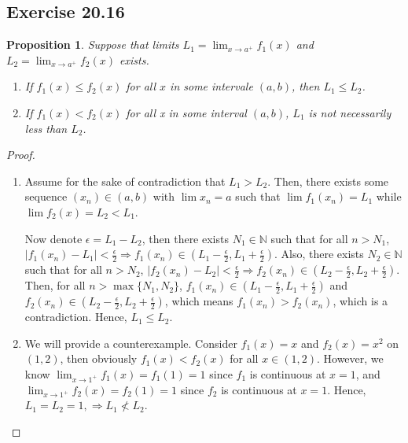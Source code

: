 \documentclass{article}
\newtheorem{proposition}[thm]{Proposition}
\renewcommand*{\implies}{\ensuremath{\Longrightarrow}}
\newcommand*{\N}{\ensuremath{\mathbb{N}}}
\begin{document}
\subsection*{Exercise 20.16}
\begin{proposition}
    Suppose that limits $L_1=\lim_{x\to a^+}f_1(x)$ and $L_2=\lim_{x\to a^+}f_2(x)$ 
    exists. 
    \begin{enumerate}
        \item [\textbf{(a)}] If $f_1(x)\le f_2(x)$ for all $x$ in some intervale $(a,b)$, 
        then $L_1\le L_2$.

        \item [\textbf{(b)}] If $f_1(x)<f_2(x)$ for all x in some interval $(a,b)$, 
        $L_1$ is not necessarily less than $L_2$.
    \end{enumerate}
\end{proposition}
\begin{proof}
    \begin{enumerate}
        \item [\textbf{(a)}] Assume for the sake of contradiction that $L_1 > L_2$. Then, 
        there exists some sequence $(x_n)\in(a,b)$ with $\lim x_n=a$ such that $\lim f_1(x_n)=L_1$ 
        while $\lim f_2(x)=L_2<L_1$.

        Now denote $\epsilon = L_1-L_2$, then there exists $N_1\in\N$ such that for all $n>N_1$, 
        $|f_1(x_n)-L_1|<\frac{\epsilon}{2}\implies f_1(x_n)\in(L_1-\frac{\epsilon}{2},L_1+\frac{\epsilon}{2})$. Also, 
        there exists $N_2\in\N$ such that for all $n>N_2$,
        $|f_2(x_n)-L_2|<\frac{\epsilon}{2}\implies f_2(x_n)\in(L_2-\frac{\epsilon}{2},L_2+\frac{\epsilon}{2})$. 
        Then, for all $n>\max\{N_1,N_2\}$, $f_1(x_n)\in(L_1-\frac{\epsilon}{2},L_1+\frac{\epsilon}{2})$ and
        $f_2(x_n)\in(L_2-\frac{\epsilon}{2},L_2+\frac{\epsilon}{2})$, which means $f_1(x_n)>f_2(x_n)$, which is a
        contradiction. Hence, $L_1\le L_2$.

        \item [\textbf{(b)}] We will provide a counterexample. Consider $f_1(x)=x$ and $f_2(x)=x^2$ on
        $(1,2)$, then obviously $f_1(x)<f_2(x)$ for all $x\in(1,2)$. However, we know 
        $\lim_{x\to 1^+}f_1(x)=f_1(1)=1$ since $f_1$ is continuous at $x=1$, and 
        $\lim_{x\to 1^+}f_2(x)=f_2(1)=1$ since $f_2$ is continuous at $x=1$. Hence, $L_1=L_2=1,
        \implies L_1\not<L_2$.
    \end{enumerate}
\end{proof}
\end{document}

